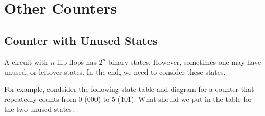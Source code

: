 \section{Other Counters}
\label{sec:other-counter}

\subsection{Counter with Unused States}
\label{subsec:counter-with-unused-states}

A circuit with $n$ flip-flops has $2^n$ binary states. However, sometimes one may have unused, or leftover states. In the end, we need to consider these states.

For example, condsider the following state table and diagram for a counter that repeatedly counts from 0 (000) to 5 (101). What should we put in the table for the two unused states.
